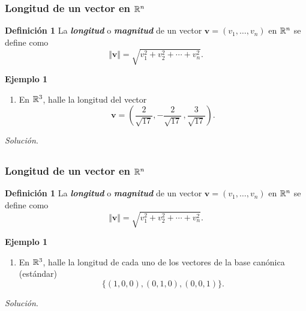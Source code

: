 \begin{frame}\frametitle{Longitud de un vector en $\mathbb{R}^n$}
	
	\begin{defi}{\textbf{Definición 1}}\justifying
		La \textbf{\textit{longitud}} o \textbf{\textit{magnitud}} de un vector $\mathbf{v}=(v_1,\hdots,v_n)$ en $\mathbb{R}^n$ se define
		como
		\[
		\Vert \mathbf{v}\Vert = \sqrt{v_1^2+v_2^2+\cdots+v_n^2}.
		\]
	\end{defi}	
	
	\begin{ej}{\textbf{Ejemplo 1}}
		\begin{enumerate}\justifying
			\item[\labelname{$b$}] En  $\mathbb{R}^3$, halle la longitud del vector 
			\[
			\mathbf{v} = \left( \frac{2}{\sqrt{17}} , -\frac{2}{\sqrt{17}}\,, \frac{3}{\sqrt{17}} \right). 
			\]
		\end{enumerate}
	\end{ej}
	\textit{Solución}.
	
\end{frame}


\subsection{}

\begin{frame}\frametitle{Longitud de un vector en $\mathbb{R}^n$}
	
	\begin{defi}{\textbf{Definición 1}}\justifying
		La \textbf{\textit{longitud}} o \textbf{\textit{magnitud}} de un vector $\mathbf{v}=(v_1,\hdots,v_n)$ en $\mathbb{R}^n$ se define
		como
		\[
		\Vert \mathbf{v}\Vert = \sqrt{v_1^2+v_2^2+\cdots+v_n^2}.
		\]
	\end{defi}	
	
	\begin{ej}{\textbf{Ejemplo 1}}
		\begin{enumerate}\justifying
			\item[\labelname{$c$}] En  $\mathbb{R}^3$, halle la longitud de cada uno de los vectores de la base canónica (estándar)
			\[
			\{ (1,0,0), (0,1,0), (0,0,1) \}.
			\]
		\end{enumerate}
	\end{ej}
	\textit{Solución}.
	
\end{frame}

